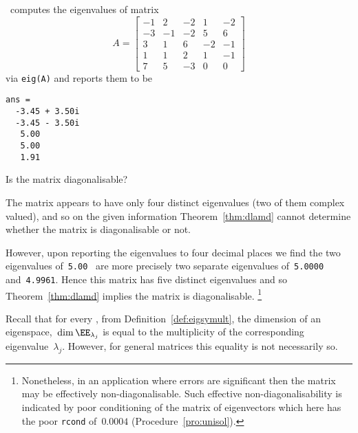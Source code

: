 \begin{example} \label{eg:}
\script\ computes the eigenvalues of matrix
\begin{equation*}
A=\begin{bmatrix}-1&2&-2&1&-2
\\-3&-1&-2&5&6
\\3&1&6&-2&-1
\\1&1&2&1&-1
\\7&5&-3&0&0 \end{bmatrix}
\end{equation*}
via \verb|eig(A)| and reports them to be \twodp
\begin{verbatim}
ans =
  -3.45 + 3.50i
  -3.45 - 3.50i
   5.00
   5.00
   1.91
\end{verbatim}
Is the matrix diagonalisable?
\begin{solution} 
The matrix appears to have only four distinct eigenvalues (two of them complex valued), and so on the given information Theorem~\ref{thm:dlamd} cannot determine whether the matrix is diagonalisable or not.

However, upon reporting the eigenvalues to four decimal places we find the two eigenvalues of~\verb|5.00| \twodp\ are more precisely two separate eigenvalues of~\verb|5.0000| and~\verb|4.9961|.
Hence this matrix has five distinct eigenvalues and so Theorem~\ref{thm:dlamd} implies the matrix is diagonalisable.
\footnote{Nonetheless, in an application where errors are significant then the matrix may be effectively non-diagonalisable.
Such effective non-diagonalisability is indicated by poor conditioning of the matrix of eigenvectors which here has the poor \texttt{rcond} of~\(0.0004\) (Procedure~\ref{pro:unisol}).}
\end{solution}
\end{example}






Recall that for every , from Definition~\ref{def:eigsymult}, the dimension of an eigenspace,~\(\dim\EE_{\lambda_j}\) is equal to the multiplicity of the corresponding eigenvalue~\(\lambda_j\).
However, for general matrices this equality is not necessarily so.


